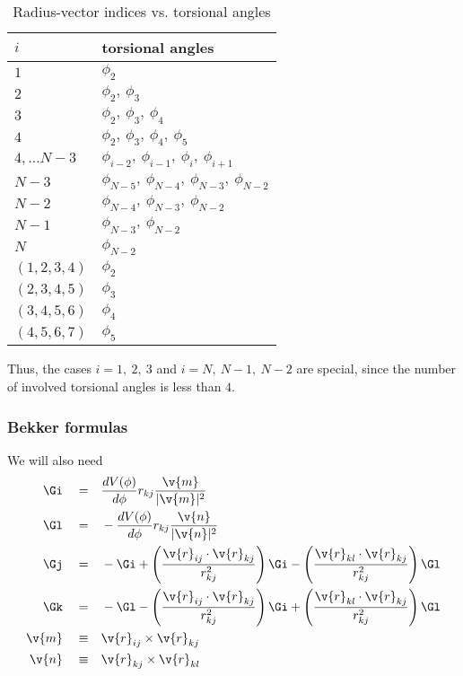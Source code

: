 \begin{table}
  \centering
  \caption{Radius-vector indices vs. torsional angles}
  \begin{tabular}{|p{3cm}|p{5cm}|}
\hline
$i$ 	& 	torsional angles \\
\hline
  $1$	&	$\phi_2$ \\
  $2$	&	$\phi_2,\ \phi_3$ \\
  $3$	&	$\phi_2,\ \phi_3,\ \phi_4$ \\
  $4$	&	$\phi_2,\ \phi_3,\ \phi_4,\ \phi_5$ \\
  $4,\ldots N-3$	&	$\phi_{i-2},\ \phi_{i-1},\ \phi_i,\ \phi_{i+1}$ \\
  $N-3$		& $\phi_{N-5},\ \phi_{N-4},\ \phi_{N-3},\ \phi_{N-2}$	\\
  $N-2$		& $\phi_{N-4},\ \phi_{N-3},\ \phi_{N-2}$	\\
  $N-1$		& $\phi_{N-3},\ \phi_{N-2}$			\\
  $N$		& $\phi_{N-2}$		\\
  $(1,2,3,4)$	& $\phi_2$ \\
  $(2,3,4,5)$	& $\phi_3$ \\
  $(3,4,5,6)$	& $\phi_4$ \\
  $(4,5,6,7)$	& $\phi_5$ \\
\hline
  \end{tabular}
\end{table}
Thus, the cases $i=1,\ 2,\ 3$ and $i=N,\ N-1,\ N-2$ are special, since the number
of involved torsional angles is less than $4$. 


\subsubsection{Bekker formulas}

We will also need \cite{Bekker95}
\begin{align}
  \Gi\quad=&\quad \frac{dV(\phi)}{d\phi}r_{kj}\frac{\v{m}}{|\v{m}|^2}\\
  \Gl\quad=&\quad-\frac{dV(\phi)}{d\phi}r_{kj}\frac{\v{n}}{|\v{n}|^2}\\
\Gj\quad=&\quad-\Gi +\left(\frac{\v{r}_{ij}\cdot{\v{r}_{kj}}}{r_{kj}^2}\right)\Gi
  -\left(\frac{\v{r}_{kl}\cdot{\v{r}_{kj}}}{r_{kj}^2}\right)\Gl\\
  \Gk\quad=&\quad-\Gl
  -\left(\frac{\v{r}_{ij}\cdot{\v{r}_{kj}}}{r_{kj}^2}\right)\Gi
  +\left(\frac{\v{r}_{kl}\cdot{\v{r}_{kj}}}{r_{kj}^2}\right)\Gl\\
\v{m}\quad\equiv&\quad\v{r}_{ij}\times\v{r}_{kj}\\
\v{n}\quad\equiv&\quad\v{r}_{kj}\times\v{r}_{kl}
\end{align}

